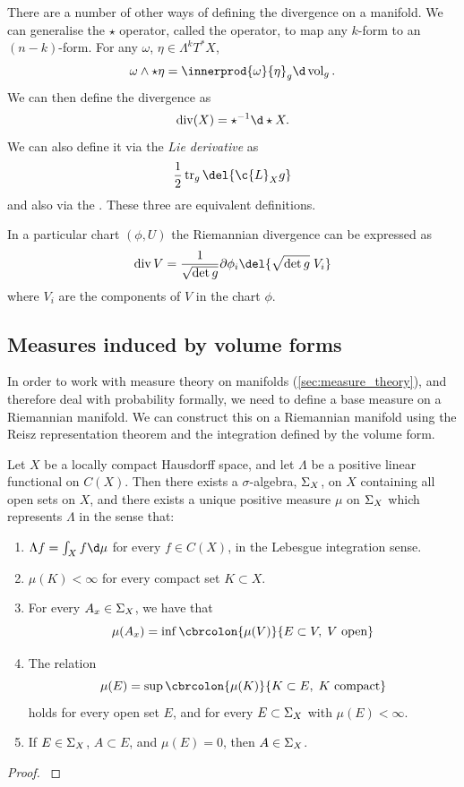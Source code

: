 There are a number of other ways of defining the divergence on a manifold.
We can generalise the \(\star\) operator, called the  operator, to map any \(k\)-form to an \((n-k)\)-form.
For any \(\omega\), \(\eta\in \Lambda^kT^*X\),
\[
	\omega\wedge\star\eta = \innerprod{\omega}{\eta}_g \d\vol_g	
.\]
We can then define the divergence as
\[
	\dive(X) = \star^{-1} \d \star X
.\]
We can also define it via the \emph{Lie derivative} as
\[
	\frac{1}{2}\tr_g\del{\c{L}_X g}
\]
and also via the .
These three are equivalent definitions.

In a particular chart \((\phi, U)\) the Riemannian divergence can be expressed as 
\[\dive V = \frac{1}{\sqrt{\det g}} \partial\phi_i \del{\sqrt{\det g}\; V_i} \label{def:riemannain_divergence_chart}\]
where \(V_i\) are the components of \(V\) in the chart \(\phi\).

\subsection{Measures induced by volume forms}
\label{sec:riemannain_volume_measure}

In order to work with measure theory on manifolds (\cref{sec:measure_theory}), and therefore deal with probability formally, we need to define a base measure on a Riemannian manifold.
We can construct this on a Riemannian manifold using the Reisz representation theorem and the integration defined by the volume form.

\begin{theorem}
	\label{thm:riesz-markov-kakutani}
	Let \(X\) be a locally compact Hausdorff space, and let \(\Lambda\) be a positive linear functional on \(C(X)\). Then there exists a \(\sigma\)-algebra, \(\Sigma_{X}\), on \(X\) containing all open sets on \(X\), and there exists a unique positive measure \(\mu\) on \(\Sigma_{X}\) which represents \(\Lambda\) in the sense that:
	\begin{enumerate}
		\item \(\Lambda f = \int_X f \d \mu\) for every \(f\in C(X)\), in the Lebesgue integration sense.
		\item \(\mu(K) < \infty \) for every compact set \(K \subset X\).
		\item For every \(A_x \in \Sigma_{X}\), we have that \[\mu(A_x) = \inf \cbrcolon{\mu(V)}{E \subset V, \; V \text{ open}}\]
		\item The relation
		\[\mu(E) = \sup \cbrcolon{\mu(K)}{K \subset E, \; K\text{ compact}}\]
		holds for every open set \(E\), and for every \(E\subset \Sigma_{X}\) with \(\mu(E) < \infty\).
		\item If \(E\in \Sigma_{X}\), \(A \subset E\), and \(\mu(E) = 0\), then \(A\in \Sigma_{X}\).
	\end{enumerate}
\end{theorem}
\begin{proof}
	\textcite[Theorem 2.14]{rudin1987real}
\end{proof}

